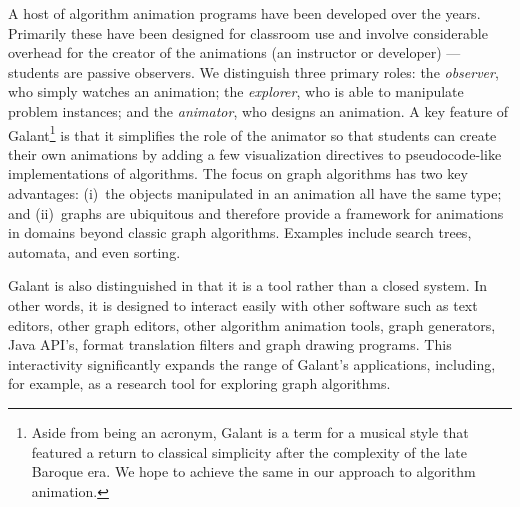   A host of algorithm animation programs have been developed over the
  years. Primarily these have been designed for classroom use and involve
  considerable overhead for the creator of the animations (an instructor or
  developer) --- students are passive observers.  We distinguish three
  primary roles: the \emph{observer}, who simply watches an animation; the
  \emph{explorer}, who is able to manipulate problem instances; and the
  \emph{animator}, who designs an animation.  A key feature of Galant\footnote{
    Aside from being an acronym, Galant is a term for a musical style
that featured a return to classical simplicity after the complexity of the late Baroque era. We hope to achieve the same in our approach to algorithm animation.
} is that
  it simplifies the role of the animator so that students can create their
  own animations by adding a few visualization directives to pseudocode-like
  implementations of algorithms.  The focus on graph algorithms has two key
  advantages: (i)~the objects manipulated in an animation all have the same
  type; and (ii)~graphs are ubiquitous and therefore provide a framework for
  animations in domains beyond classic graph algorithms.  Examples include
  search trees, automata, and even sorting.

  Galant is also distinguished in that it is a tool rather than a closed
  system.  In other words, it is designed to interact easily with other
  software such as text editors, other graph editors, other algorithm
  animation tools, graph generators, Java API's, format translation filters
  and graph drawing programs. This interactivity significantly expands the
  range of Galant's applications, including, for example, as a research tool
  for exploring graph algorithms.
